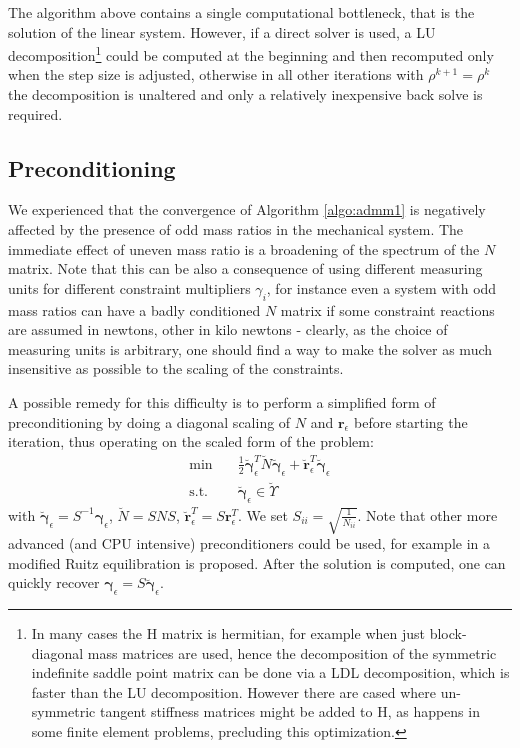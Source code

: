 \documentclass[final,3p]{elsarticle}
\newcommand{\vect}[1]{\bm{#1}}
\begin{document}
The algorithm above contains a single computational bottleneck, that is the solution of the linear system. However, if a direct solver is used, a LU decomposition\footnote{In many cases the H matrix is hermitian, for example when just block-diagonal mass matrices are used, hence the decomposition of the symmetric indefinite saddle point matrix can be done via a LDL decomposition, which is faster than the LU decomposition. However there are cased where un-symmetric tangent stiffness matrices might be added to H, as happens in some finite element problems, precluding this optimization.} could be computed at the beginning and then recomputed only when the step size is adjusted, otherwise in all other iterations with $\rho^{k+1}=\rho^{k}$ the decomposition is unaltered and only a relatively inexpensive back solve is required.


\subsection{Preconditioning}

We experienced that the convergence of Algorithm \ref{algo:admm1} is negatively affected by the presence of odd mass ratios in the mechanical system. The immediate effect of uneven mass ratio is a broadening of the spectrum of the $N$ matrix. Note that this can be also a consequence of using different measuring units for different constraint multipliers $\gamma_i$, for instance even a system with odd mass ratios can have a badly conditioned $N$ matrix if some constraint reactions are assumed in newtons, other in kilo newtons - clearly, as the choice of measuring units is arbitrary, one should find a way to make the solver as much insensitive as possible to the scaling of the constraints. 

A possible remedy for this difficulty is to perform a simplified form of preconditioning by doing a diagonal scaling of $N$ and $\vect{r}_\epsilon$ before starting the iteration, thus operating on the scaled form of the problem:
%
\begin{align}
	\text{min} \quad & \frac{1}{2} \breve{\vect{\gamma}}_\epsilon^T \breve{N} \breve{\vect{\gamma}}_\epsilon + \breve{\vect{r}}^T_\epsilon \breve{\vect{\gamma}}_\epsilon \\
	\text{s.t.} \quad & \breve{\vect{\gamma}}_\epsilon \in \breve{\Upsilon} 
	\label{eq:ChronoCCP_min_scaled}
\end{align}
%
with $\breve{\vect{\gamma}}_\epsilon = S^{-1} \vect{\gamma}_\epsilon$, $\breve{N} = S N S$, 
$\breve{\vect{r}}^T_\epsilon = S \vect{r}^T_\epsilon$. 
We set $S_{ii} = \sqrt{\frac{1}{N_{ii}}}$. 
Note that other more advanced (and CPU intensive) preconditioners could be used, for example in \cite{Stellato2020} a modified Ruitz equilibration is proposed.  
After the solution is computed, one can quickly recover $\vect{\gamma}_\epsilon = S \breve{\vect{\gamma}}_\epsilon$. 
\end{document}
